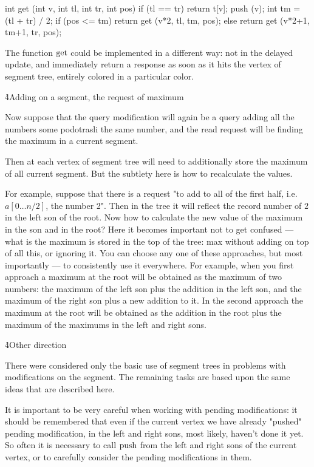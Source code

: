 int get (int v, int tl, int tr, int pos) {
if (tl == tr)
return t[v];
push (v);
int tm = (tl + tr) / 2;
if (pos <= tm)
return get (v*2, tl, tm, pos);
else
return get (v*2+1, tm+1, tr, pos);
}
\endcode

The function $\rm get$ could be implemented in a different way: not in the delayed update, and immediately return a response as soon as it hits the vertex of segment tree, entirely colored in a particular color.

\h4{Adding on a segment, the request of maximum}

Now suppose that the query modification will again be a query adding all the numbers some podotrasli the same number, and the read request will be finding the maximum in a current segment.

Then at each vertex of segment tree will need to additionally store the maximum of all current segment. But the subtlety here is how to recalculate the values.

For example, suppose that there is a request "to add to all of the first half, i.e. $a[0 \ldots n/2]$, the number 2". Then in the tree it will reflect the record number of $2$ in the left son of the root. Now how to calculate the new value of the maximum in the son and in the root? Here it becomes important not to get confused --- what is the maximum is stored in the top of the tree: max without adding on top of all this, or ignoring it. You can choose any one of these approaches, but most importantly --- to consistently use it everywhere. For example, when you first approach a maximum at the root will be obtained as the maximum of two numbers: the maximum of the left son plus the addition in the left son, and the maximum of the right son plus a new addition to it. In the second approach the maximum at the root will be obtained as the addition in the root plus the maximum of the maximums in the left and right sons.

\h4{Other direction}

There were considered only the basic use of segment trees in problems with modifications on the segment. The remaining tasks are based upon the same ideas that are described here.

It is important to be very careful when working with pending modifications: it should be remembered that even if the current vertex we have already "pushed" pending modification, in the left and right sons, most likely, haven't done it yet. So often it is necessary to call $\rm push$ from the left and right sons of the current vertex, or to carefully consider the pending modifications in them.


